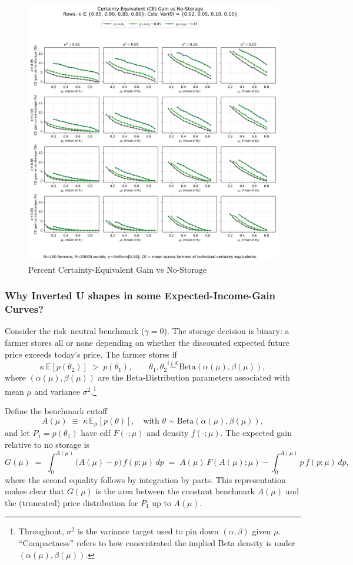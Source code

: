 \begin{figure}[ht!]
    \centering
    \includegraphics[width=\linewidth]{model_figures/cegain_grid_4x4.png}
    \caption{Percent Certainty-Equivalent Gain vs No-Storage}
    \label{fig:CE gains}
\end{figure}


\subsubsection{Why Inverted U shapes in some Expected-Income-Gain Curves?}
\noindent
Consider the risk--neutral benchmark ($\gamma=0$). The storage decision is binary: a farmer stores all or none depending on whether the discounted expected future price exceeds today's price. The farmer stores if
\[
\kappa\,\mathbb{E}\!\left[p(\theta_2)\right] \;>\; p(\theta_1), 
\qquad \theta_1,\theta_2\stackrel{i.i.d.}{\sim}\mathrm{Beta}\!\left(\alpha(\mu),\beta(\mu)\right),
\]
where $(\alpha(\mu),\beta(\mu))$ are the Beta-Distribution parameters associated with mean $\mu$ and variance $\sigma^2$.\footnote{Throughout, $\sigma^2$ is the variance target used to pin down $(\alpha,\beta)$ given $\mu$. ``Compactness'' refers to how concentrated the implied Beta density is under $(\alpha(\mu),\beta(\mu))$.}

Define the benchmark cutoff
\[
A(\mu)\;\equiv\; \kappa\,\mathbb{E}_{\mu}\!\left[p(\theta)\right], 
\quad \text{with } \theta\sim\mathrm{Beta}\!\left(\alpha(\mu),\beta(\mu)\right),
\]
and let $P_1=p(\theta_1)$ have cdf $F(\cdot;\mu)$ and density $f(\cdot;\mu)$. The expected gain relative to no storage is
\[
G(\mu) \;=\; \int_{0}^{A(\mu)} \big(A(\mu)-p\big)\,f(p;\mu)\,dp
\;=\; A(\mu)\,F\!\left(A(\mu);\mu\right)-\int_{0}^{A(\mu)} p\,f(p;\mu)\,dp,
\]
where the second equality follows by integration by parts. This representation makes clear that $G(\mu)$ is the area between the constant benchmark $A(\mu)$ and the (truncated) price distribution for $P_1$ up to $A(\mu)$.

